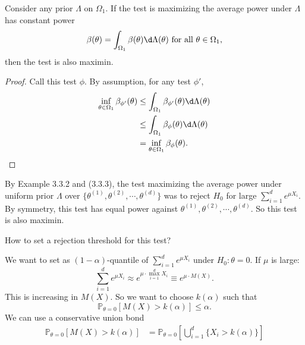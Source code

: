 \documentclass[a4paper]{article}
\begin{document}
\begin{eg}
\begin{answer}
\begin{prop}
			Consider any prior $\Lambda$ on $\Omega_1$. If the test is maximizing the average power under $\Lambda$ has constant power
			\begin{equation}
				\beta(\theta) = \int_{\Omega_1} \beta(\theta) \d \Lambda(\theta) \text{ for all } \theta \in \Omega_1,
			\end{equation}
			then the test is also maximin.
		\end{prop}
		\begin{proof}
			Call this test $\phi$. By assumption, for any test $\phi'$,
			\begin{equation}
				\begin{aligned}
					\inf\limits_{\theta \in \Omega_1} \beta_{\phi'}(\theta) &\leq \int_{\Omega_1} \beta_{\phi'}(\theta) \d \Lambda(\theta) \\
					&\leq \int_{\Omega_1} \beta_{\phi}(\theta) \d \Lambda(\theta) \\
					&= \inf\limits_{\theta \in \Omega_1} \beta_{\phi}(\theta).
				\end{aligned}
			\end{equation}
		\end{proof}
		By Example 3.3.2 and (3.3.3), the test maximizing the average power under uniform prior $\Lambda$ over $\{\theta^{(1)}, \theta^{(2)}, \cdots, \theta^{(d)}\}$ was to reject $H_0$ for large $\sum\limits_{i=1}^d e^{\mu X_i}$. By symmetry, this test has equal power against $\theta^{(1)}, \theta^{(2)}, \cdots, \theta^{(d)}$. So this test is also maximin.
	\end{answer}
	\begin{question}
		How to set a rejection threshold for this test?
	\end{question}
	\begin{answer}
		We want to set as $(1-\alpha)$-quantile of $\sum\limits_{i=1}^d e^{\mu X_i}$ under $H_0: \theta = 0$. If $\mu$ is large:
		\begin{equation*}
			\sum\limits_{i=1}^d e^{\mu X_i} \approx e^{\mu \cdot \max\limits_{i=1}^d X_i} \equiv e^{\mu \cdot M(X)}.
		\end{equation*}
		This is increasing in $M(X)$. So we want to choose $k(\alpha)$ such that
		\begin{equation*}
			\mathbb{P}_{\theta = 0}[M(X) > k(\alpha)] \leq \alpha.
		\end{equation*}
		We can use a conservative union bond
		\begin{equation*}
			\begin{aligned}
				\mathbb{P}_{\theta = 0}[M(X) > k(\alpha)] &= \mathbb{P}_{\theta = 0}\left[\bigcup\limits_{i=1}^d \{X_i > k(\alpha)\}\right] \\

\end{aligned}
\end{equation*}
\end{answer}
\end{eg}
\end{document}
